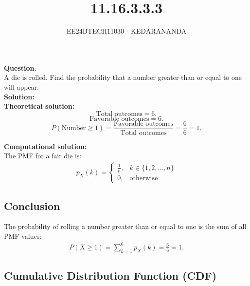 \documentclass[journal]{IEEEtran}
\begin{document}
	
	
	\vspace{3cm}
	
	\title{11.16.3.3.3}
	\author{EE24BTECH11030 - KEDARANANDA }
	{\let\newpage\relax\maketitle}
	
	\renewcommand{\thefigure}{\theenumi}
	\renewcommand{\thetable}{\theenumi}
	\setlength{\intextsep}{10pt} %
	
	
	\renewcommand{\thetable}{\theenumi}
	
	
	\textbf{Question}:\\
	A die is rolled. Find the probability that a number greater than or equal to one will appear.\\
	\textbf{Solution: }\\
	\textbf{Theoretical solution: }\\
	\[
	\text{Total outcomes} = 6.
	\]
	\[
	\text{Favorable outcomes} = 6.
	\]
	\[
	P(\text{Number} \geq 1) = \frac{\text{Favorable outcomes}}{\text{Total outcomes}} = \frac{6}{6} = 1.
	\]
	
	\textbf{Computational solution: }\\
	The PMF for a fair die is:
	\begin{align}
		p_{X}(k) =
		\begin{cases}
			\frac{1}{n}, & k \in \{1, 2,\dots ,n\} \\
			0, & \text{otherwise}
		\end{cases}
	\end{align}	
	\subsection*{Conclusion}
	The probability of rolling a number greater than or equal to one is the sum of all PMF values:
	\begin{align}
		P(X \geq 1) = \sum_{k=1}^{6} p_X(k) = \frac{6}{6} = 1.
	\end{align}
	\subsection*{Cumulative Distribution Function (CDF)}
	
\end{document}
